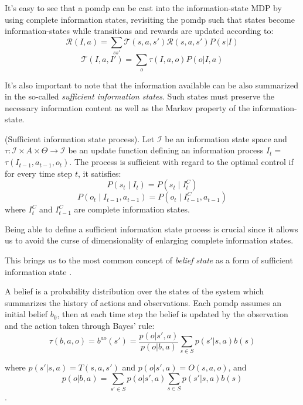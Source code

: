 It's easy to see that a \gls{pomdp} can be cast into the information-state MDP by using complete 
information states, revisiting the \gls{pomdp} such that states become information-states while transitions 
and rewards are updated according to:
$$\mathcal{R}(I,a) = \sum_{s s'} \mathcal{T}(s,a,s')\mathcal{R}(s,a,s')P(s|I) $$
$$\mathcal{T}(I,a,I') = \sum_o \tau(I,a,o)P(o|I,a) $$


It's also important to note that the information available can be also summarized in the 
so-called \textit{sufficient information states}. Such states must preserve
the necessary information content as well as the Markov property of the information-state.
\begin{definition}
    
    (Sufficient information state process). Let \(\mathcal{I}\) be an information state space 
    and \(\tau: \mathcal{I} \times A \times \Theta \rightarrow \mathcal{I}\) be an update function defining an information process \(I_{t}=\) 
    \(\tau\left(I_{t-1}, a_{t-1}, o_{t}\right)\). The process is sufficient with regard to the optimal control 
    if for every time step $t$, it satisfies:
    $$P\left(s_{t} \mid I_{t}\right)=P\left(s_{t} \mid I_{t}^{C}\right)$$
    $$P\left(o_{t} \mid I_{t-1}, a_{t-1}\right)=P\left(o_{t} \mid I_{t-1}^{C}, a_{t-1}\right)$$
    where \(I_{t}^{C}\) and \(I_{t-1}^{C}\) are complete information states.

\end{definition} 

Being able to define a sufficient information state process is crucial since it allows us to avoid 
the curse of dimensionality of enlarging complete information states.

This brings us to the most common concept of \textit{belief state} as a form of sufficient information state
\cite{strm1965OptimalCO}.

A belief is a probability distribution over the states of the system which summarizes the history of 
actions and observations. Each \gls{pomdp} assumes an initial belief $b_0$, then at each time step
the belief is updated by the observation and the action taken through Bayes' rule:
\begin{equation}
    \tau(b,a,o) = b^{ao}(s')=\displaystyle\frac{p(o|s',a)}{p(o|b,a)}\sum_{s\in S}p(s'|s,a)b(s)
    \label{eq:beliefupdate}
\end{equation}

where $p(s'|s,a) = T(s,a,s')$ and $p(o|s',a) = O(s,a,o)$, and
$$p(o|b,a)=\displaystyle\sum_{s'\in S}p(o|s',a)\sum_{s\in S}p(s'|s,a)b(s)$$.


